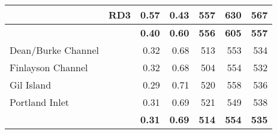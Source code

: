 \documentclass[12pt]{article}\usepackage[]{graphicx}\usepackage[]{color}
\begin{document}
\begin{table}[!h]
\begin{tabular}[t]{llrrrrr}
 & RD3 & 0.57 & 0.43 & 557 & 630 & 567\\
\hline
\textbf{} & \textbf{} & \textbf{0.40} & \textbf{0.60} & \textbf{556} & \textbf{605} & \textbf{557}\\
\hline
Dean/Burke Channel &  & 0.32 & 0.68 & 513 & 553 & 534\\
Finlayson Channel &  & 0.32 & 0.68 & 504 & 554 & 532\\
Gil Island &  & 0.29 & 0.71 & 520 & 558 & 536\\
Portland Inlet &  & 0.31 & 0.69 & 521 & 549 & 538\\
\hline
\textbf{} & \textbf{} & \textbf{0.31} & \textbf{0.69} & \textbf{514} & \textbf{554} & \textbf{535}\\
\bottomrule
\end{tabular}
\end{table}
\end{document}
